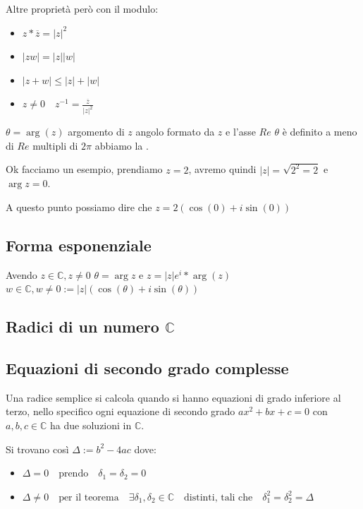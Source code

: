 \documentclass{article}
\begin{document}
Altre proprietà però con il modulo:
\begin{itemize}
        \item $z * \overline{z} =   |z|^{2}$ \\
        \item $|zw| = |z| |w|$ \\
        \item $|z+w| \le |z| + |w|$ \\
        \item $z \not = 0 \quad z^{-1} = \frac{\overline{z}}{|z|^{2}} $ \\
\end{itemize}


$\theta = \arg(z)$ argomento di $ z $  angolo formato da $ z $  e l'asse $Re$ $\theta$ è definito a meno di $Re$ multipli di $2\pi$ abbiamo la .

Ok facciamo un esempio, prendiamo $z = 2$, avremo quindi $|z| = \sqrt{2^2 = 2}$ e $\arg{z} = 0$.\par
A questo punto possiamo dire che $z = 2(\cos(0) + i\sin(0))$ \newline




\subsection{Forma esponenziale}
Avendo $z \in \mathbb{C}, z \not = 0$ \newline
$\theta = \arg z$ e  $z = | z | e^i*\arg(z)$ \newline
$w \in \mathbb{C}, w \not = 0 := |z| (\cos(\theta) + i\sin(\theta))$ \newline


\subsection{Radici di un numero $ \mathbb{C} $}


\subsection{Equazioni di secondo grado complesse}
Una radice semplice si calcola quando si hanno equazioni di grado inferiore al terzo, nello specifico ogni equazione di secondo grado $ax^2+bx+c = 0$ con $a,b,c \in \mathbb{C}$ ha due soluzioni in $\mathbb{C}$. \par
Si trovano così  $\Delta := b^2 - 4ac$ dove:
\begin{itemize}
        \item $\Delta = 0 \quad \mbox{prendo} \quad \delta_1 = \delta_2 = 0$	
        \item $\Delta \not = 0 \quad \mbox{per il teorema} \quad \exists \delta_1,\delta_2 \in \mathbb{C} \quad \mbox{distinti, tali che} \quad \delta_1^2 = \delta_2^2 = \Delta$	
\end{itemize}
\end{document}
